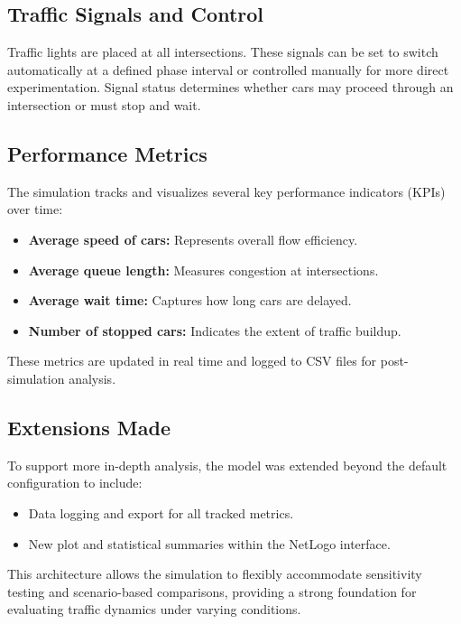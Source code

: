 \documentclass[12pt]{article}
\begin{document}
\subsection{Traffic Signals and Control}

Traffic lights are placed at all intersections. These signals can be set to switch automatically at a defined phase interval or controlled manually for more direct experimentation. Signal status determines whether cars may proceed through an intersection or must stop and wait.

\subsection{Performance Metrics}

The simulation tracks and visualizes several key performance indicators (KPIs) over time:
\begin{itemize}
    \item \textbf{Average speed of cars:} Represents overall flow efficiency.
    \item \textbf{Average queue length:} Measures congestion at intersections.
    \item \textbf{Average wait time:} Captures how long cars are delayed.
    \item \textbf{Number of stopped cars:} Indicates the extent of traffic buildup.
\end{itemize}
These metrics are updated in real time and logged to CSV files for post-simulation analysis.

\subsection{Extensions Made}

To support more in-depth analysis, the model was extended beyond the default configuration to include:
\begin{itemize}
    \item Data logging and export for all tracked metrics.
    \item New plot and statistical summaries within the NetLogo interface.
\end{itemize}

This architecture allows the simulation to flexibly accommodate sensitivity testing and scenario-based comparisons, providing a strong foundation for evaluating traffic dynamics under varying conditions.

\newpage
\end{document}
